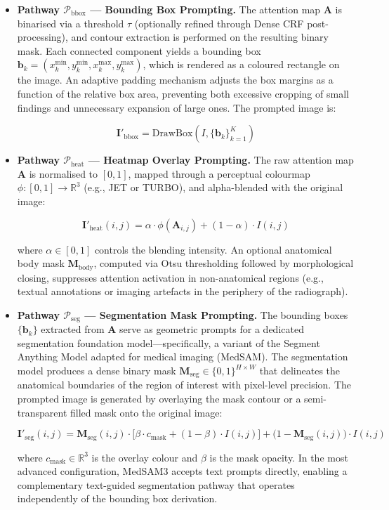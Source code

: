 \begin{itemize}

    \item \textbf{Pathway $\mathcal{P}_{\text{bbox}}$ --- Bounding Box Prompting.} The attention map $\mathbf{A}$ is binarised via a threshold $\tau$ (optionally refined through Dense CRF post-processing), and contour extraction is performed on the resulting binary mask. Each connected component yields a bounding box $\mathbf{b}_k = (x_k^{\min}, y_k^{\min}, x_k^{\max}, y_k^{\max})$, which is rendered as a coloured rectangle on the image. An adaptive padding mechanism adjusts the box margins as a function of the relative box area, preventing both excessive cropping of small findings and unnecessary expansion of large ones. The prompted image is:

    \[
    \mathbf{I}'_{\text{bbox}} = \text{DrawBox}(I, \{\mathbf{b}_k\}_{k=1}^{K})
    \]

    \item \textbf{Pathway $\mathcal{P}_{\text{heat}}$ --- Heatmap Overlay Prompting.} The raw attention map $\mathbf{A}$ is normalised to $[0, 1]$, mapped through a perceptual colourmap $\phi : [0,1] \to \mathbb{R}^3$ (e.g., JET or TURBO), and alpha-blended with the original image:
    
    \[
    \mathbf{I}'_{\text{heat}}(i,j) = \alpha \cdot \phi\!\left(\mathbf{A}_{i,j}\right) + (1 - \alpha) \cdot I(i,j)
    \]

    where $\alpha \in [0, 1]$ controls the blending intensity. An optional anatomical body mask $\mathbf{M}_{\text{body}}$, computed via Otsu thresholding followed by morphological closing, suppresses attention activation in non-anatomical regions (e.g., textual annotations or imaging artefacts in the periphery of the radiograph).
    
    \item \textbf{Pathway $\mathcal{P}_{\text{seg}}$ --- Segmentation Mask Prompting.} The bounding boxes $\{\mathbf{b}_k\}$ extracted from $\mathbf{A}$ serve as geometric prompts for a dedicated segmentation foundation model—specifically, a variant of the Segment Anything Model adapted for medical imaging (MedSAM). The segmentation model produces a dense binary mask $\mathbf{M}_{\text{seg}} \in \{0, 1\}^{H \times W}$ that delineates the anatomical boundaries of the region of interest with pixel-level precision. The prompted image is generated by overlaying the mask contour or a semi-transparent filled mask onto the original image:
    
    \[
    \mathbf{I}'_{\text{seg}}(i,j) = \mathbf{M}_{\text{seg}}(i,j) \cdot \bigl[\beta \cdot c_{\text{mask}} + (1 - \beta) \cdot I(i,j)\bigr] + \bigl(1 - \mathbf{M}_{\text{seg}}(i,j)\bigr) \cdot I(i,j)
    \]
    
    where $c_{\text{mask}} \in \mathbb{R}^3$ is the overlay colour and $\beta$ is the mask opacity. In the most advanced configuration, MedSAM3 accepts text prompts directly, enabling a complementary text-guided segmentation pathway that operates independently of the bounding box derivation.

\end{itemize}

